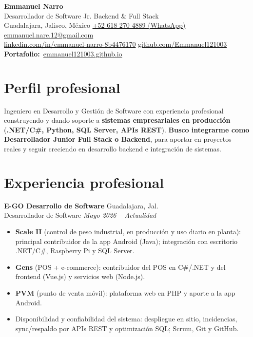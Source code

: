 \documentclass[10pt,a4paper]{article}
\newcommand{\entry}[4]{%
  \textbf{#1} \hfill {\color{muted}\small #2}\\[0pt]
  {\color{accent}\small #3} \hfill {\color{muted}\itshape\small #4}\\[1pt]
}
\begin{document}
\begin{center}
  {\color{ink}\LARGE\bfseries Emmanuel Narro}\\[2pt]
  {\color{accent} Desarrollador de Software Jr. \textbar{} Backend \& Full Stack}\\[3pt]
  {\color{muted}\small
   Guadalajara, Jalisco, México \enspace\textbullet\enspace
   \href{https://wa.me/526182704889}{+52 618 270 4889 (WhatsApp)} \enspace\textbullet\enspace
   \href{mailto:emmanuel.nare.12@gmail.com}{emmanuel.nare.12@gmail.com}\\[1pt]
   \href{https://www.linkedin.com/in/emmanuel-narro-8b4476170}{linkedin.com/in/emmanuel-narro-8b4476170}
   \enspace\textbullet\enspace
   \href{https://github.com/Emmanuel121003}{github.com/Emmanuel121003}
   \enspace\textbullet\enspace
   {\color{accent}\textbf{Portafolio:}}~\href{https://emmanuel121003.github.io/}{emmanuel121003.github.io}}
\end{center}

\section{Perfil profesional}
Ingeniero en Desarrollo y Gestión de Software con experiencia profesional construyendo y dando soporte a \textbf{sistemas
empresariales en producción} (\textbf{.NET/C\#, Python, SQL Server, APIs REST}). \textbf{Busco integrarme como Desarrollador
Junior Full Stack o Backend}, para aportar en proyectos reales y seguir creciendo en desarrollo backend e integración de sistemas.

\section{Experiencia profesional}

\entry{E-GO Desarrollo de Software}{Guadalajara, Jal.}{Desarrollador de Software}{Mayo 2026 -- Actualidad}
\begin{itemize}
  \item \textbf{Scale II} (control de peso industrial, en producción y uso diario en planta): principal contribuidor de la app Android (Java); integración con escritorio .NET/C\#, Raspberry Pi y SQL Server.
  \item \textbf{Gens} (POS + e-commerce): contribuidor del POS en C\#/.NET y del frontend (Vue.js) y servicios web (Node.js).
  \item \textbf{PVM} (punto de venta móvil): plataforma web en PHP y aporte a la app Android.
  \item Disponibilidad y confiabilidad del sistema: despliegue en sitio, incidencias, sync/respaldo por APIs REST y optimización SQL; Scrum, Git y GitHub.
\end{itemize}
\end{document}
